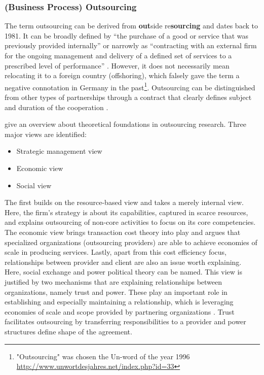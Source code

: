 			\subsubsection{(Business Process) Outsourcing}
			\label{sec:bpo}
		The term outsourcing can be derived from \textbf{out}side re\textbf{sourcing} and dates back to 1981\citep{oxford}. It can be broadly defined by \enquote{the purchase of a good or service that was previously provided internally} \citep[]{lacity1993} or narrowly as \enquote{contracting with an external firm for the ongoing management and delivery of a defined set of services to a prescribed level of performance} \citep[]{cohen2006multisourcing}. However, it does not necessarily mean relocating it to a foreign country (offshoring), which falsely gave the term a negative connotation in Germany in the past\footnote{ "Outsourcing" was chosen the Un-word of the year 1996 \url{http://www.unwortdesjahres.net/index.php?id=33}}. Outsourcing can be distinguished from other types of partnerships through a contract that clearly defines subject and duration of the cooperation \citep[]{gross2006}. 
		
		\cite{Lee:2000} give an overview about theoretical foundations in outsourcing research. Three major views are identified:
		
		\begin{itemize}
			\item Strategic management view
			\item Economic view
			\item Social view
		\end{itemize}
		
		The first builds on the resource-based view \citep{wernerfelt1984resource} and takes a merely internal view. Here, the firm's strategy is about its capabilities, captured in scarce resources, and explains outsourcing of non-core activities to focus on its core competencies. The economic view brings transaction cost theory into play and argues that specialized organizations (outsourcing providers) are able to achieve economies of scale in producing services. Lastly, apart from this cost efficiency focus, relationships between provider and client are also an issue worth explaining. Here, social exchange and power political theory \citep{lee1999effect} can be named. This view is justified by two mechanisms that are explaining relationships between organizations, namely trust and power. These play an important role in establishing and especially maintaining a relationship, which is leveraging economies of scale and scope provided by partnering organizations \citep{rai1996critical}. Trust facilitates outsourcing by transferring responsibilities to a provider and power structures define shape of the agreement.
		
